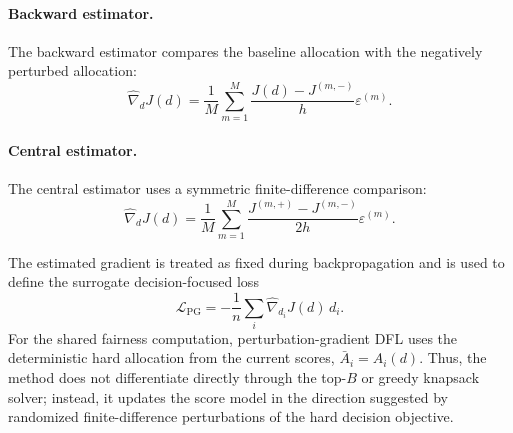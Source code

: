 \paragraph{Backward estimator.}
The backward estimator compares the baseline allocation with the negatively perturbed allocation:
\[
\widehat{\nabla}_d J(d)
=
\frac{1}{M}
\sum_{m=1}^M
\frac{J(d)-J^{(m,-)}}{h}
\varepsilon^{(m)}.
\]

\paragraph{Central estimator.}
The central estimator uses a symmetric finite-difference comparison:
\[
\widehat{\nabla}_d J(d)
=
\frac{1}{M}
\sum_{m=1}^M
\frac{J^{(m,+)}-J^{(m,-)}}{2h}
\varepsilon^{(m)}.
\]

The estimated gradient is treated as fixed during backpropagation and is used to define the surrogate decision-focused loss
\[
\mathcal{L}_{\text{PG}}
=
-
\frac{1}{n}
\sum_i
\widehat{\nabla}_{d_i}J(d)\, d_i.
\]
For the shared fairness computation, perturbation-gradient DFL uses the deterministic hard allocation from the current scores, $\bar A_i=A_i(d)$. Thus, the method does not differentiate directly through the top-$B$ or greedy knapsack solver; instead, it updates the score model in the direction suggested by randomized finite-difference perturbations of the hard decision objective.